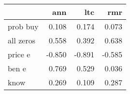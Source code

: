 \begin{tabular}{lrrr}
\toprule
{} &    ann &    ltc &    rmr \\
\midrule
prob buy  &  0.108 &  0.174 &  0.073 \\
all zeros &  0.558 &  0.392 &  0.638 \\
price e   & -0.850 & -0.891 & -0.585 \\
ben e     &  0.769 &  0.529 &  0.036 \\
know      &  0.269 &  0.109 &  0.287 \\
\bottomrule
\end{tabular}
